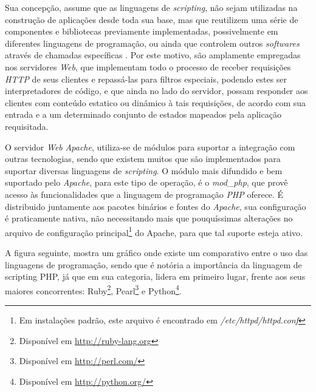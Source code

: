 Sua concepção, assume que as linguagens de \textit{scripting}, não sejam utilizadas na construção de aplicações desde toda sua base, mas que reutilizem uma série de componentes e bibliotecas previamente implementadas, possivelmente em diferentes linguagens de programação, ou ainda que controlem outros \textit{softwares} através de chamadas específicas \cite{Scripting}. Por este motivo, são amplamente empregadas nos servidores \textit{Web}, que implementam todo o processo de receber requisições \textit{HTTP} de seus clientes e repassá-las para filtros especiais, podendo estes ser interpretadores de código, e que ainda no lado do servidor, possam responder aos clientes com conteúdo estatico ou dinâmico à tais requisições, de acordo com sua entrada e a um determinado conjunto de estados mapeados pela aplicação requisitada.

O servidor \textit{Web} \textit{Apache}, utiliza-se de módulos para suportar a integração com outras tecnologias, sendo que existem muitos que são implementados para suportar diversas linguagens de \textit{scripting}. O módulo mais difundido e bem suportado pelo \textit{Apache}, para este tipo de operação, é o \textit{mod\_php}, que provê acesso às funcionalidades que a linguagem de programação \textit{PHP} oferece. É distribuido juntamente aos pacotes binários e fontes do \textit{Apache}, sua configuração é praticamente nativa, não necessitando mais que pouquíssimas alterações no arquivo de configuração principal\footnote{Em instalações padrão, este arquivo é encontrado em \textit{/etc/httpd/httpd.conf}} do Apache, para que tal suporte esteja ativo.

A figura seguinte, mostra um gráfico onde existe um comparativo entre o uso das linguagens de programação, sendo que é notória a importância da linguagem de scripting PHP, já que em sua categoria, lidera em primeiro lugar, frente aos seus maiores concorrentes: Ruby\footnote{Disponível em \url{http://ruby-lang.org}}, Pearl\footnote{Disponível em \url{http://perl.com/}} e Python\footnote{Disponível em \url{http://python.org/}}.


